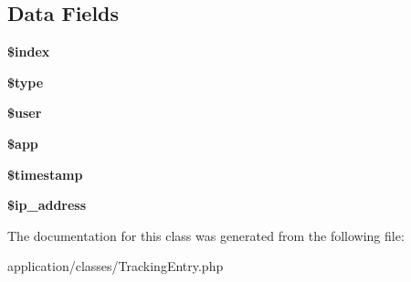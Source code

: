 \subsection*{Data Fields}
\begin{DoxyCompactItemize}
\item 
\hypertarget{class_tracking_entry_a23e53dfd2b001b81c9946fa05ec90e6f}{
{\bfseries \$index}}
\label{class_tracking_entry_a23e53dfd2b001b81c9946fa05ec90e6f}

\item 
\hypertarget{class_tracking_entry_a9a4a6fba2208984cabb3afacadf33919}{
{\bfseries \$type}}
\label{class_tracking_entry_a9a4a6fba2208984cabb3afacadf33919}

\item 
\hypertarget{class_tracking_entry_a598ca4e71b15a1313ec95f0df1027ca5}{
{\bfseries \$user}}
\label{class_tracking_entry_a598ca4e71b15a1313ec95f0df1027ca5}

\item 
\hypertarget{class_tracking_entry_adfb117f244076aa9bc269269f7e57403}{
{\bfseries \$app}}
\label{class_tracking_entry_adfb117f244076aa9bc269269f7e57403}

\item 
\hypertarget{class_tracking_entry_a2b69de9676dd97c675cd4d9bcceb684c}{
{\bfseries \$timestamp}}
\label{class_tracking_entry_a2b69de9676dd97c675cd4d9bcceb684c}

\item 
\hypertarget{class_tracking_entry_a614e10d1ab6dcf06fa7fef37af7b7eee}{
{\bfseries \$ip\_\-address}}
\label{class_tracking_entry_a614e10d1ab6dcf06fa7fef37af7b7eee}

\end{DoxyCompactItemize}


The documentation for this class was generated from the following file:\begin{DoxyCompactItemize}
\item 
application/classes/TrackingEntry.php\end{DoxyCompactItemize}
